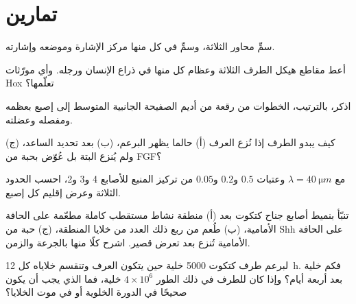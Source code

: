 \section{تمارين}

\begin{exercise}[$\star$]\label{exo:b2:limb-organogenesis:1}
سمِّ محاور  الثلاثة، وسمِّ في كل منها مركز
الإشارة وموضعه وإشارته.
\end{exercise}

\begin{exercise}[$\star$]\label{exo:b2:limb-organogenesis:2}
أعط مقاطع هيكل الطرف الثلاثة وعظام كل منها
في ذراع الإنسان ورجله. وأي مورّثات Hox تعلّمها؟
\end{exercise}

\begin{exercise}[$\star$]\label{exo:b2:limb-organogenesis:3}
اذكر، بالترتيب، الخطوات من رقعة من أديم الصفيحة الجانبية المتوسط
إلى إصبع بعظمه ومفصله وعضلته.
\end{exercise}

\begin{exercise}[$\star$]\label{exo:b2:limb-organogenesis:4}
كيف يبدو الطرف إذا نُزع العرف (أ) حالما يظهر
البرعم، (ب) بعد تحديد الساعد، (ج) ولم يُنزع
البتة بل عُوّض بحبة من FGF؟
\end{exercise}

\begin{exercise}[$\star\star$]\label{exo:b2:limb-organogenesis:5}
مع $\lambda = \qty{40}{\micro m}$ وعتبات $0.5$ و$0.2$
و$0.05$ من تركيز المنبع للأصابع 4 و3 و2، احسب
الحدود الثلاثة وعرض إقليم كل إصبع.
\end{exercise}

\begin{exercise}[$\star\star$]\label{exo:b2:limb-organogenesis:6}
تنبّأ بنميط أصابع جناح كتكوت بعد (أ) منطقة نشاط مستقطب كاملة
مطعّمة على الحافة الأمامية، (ب) طُعم من ربع ذلك العدد من
خلايا المنطقة، (ج) حبة من Shh على الحافة الأمامية تُنزع بعد
تعرض قصير. اشرح كلًا منها بالجرعة والزمن.
\end{exercise}

\begin{exercise}[$\star\star$]\label{exo:b2:limb-organogenesis:7}
لبرعم طرف كتكوت \num{5000} خلية حين يتكون العرف وتنقسم
خلاياه كل \qty{12}{h}. فكم خلية بعد أربعة أيام؟ وإذا كان
للطرف في ذلك الطور $4\times 10^{6}$ خلية، فما الذي يجب أن يكون
صحيحًا في الدورة الخلوية أو في موت الخلايا؟
\end{exercise}

